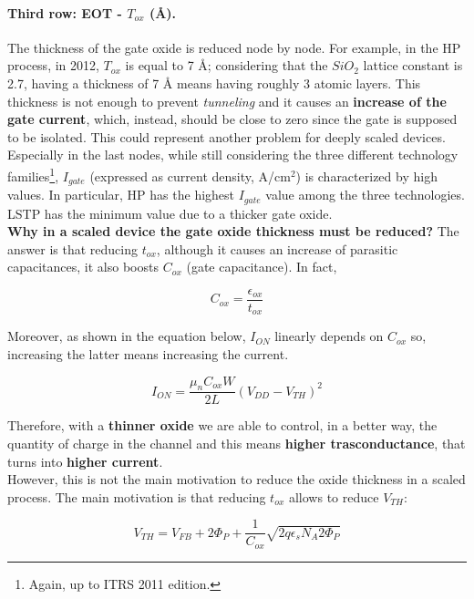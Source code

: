 \documentclass[a4paper, 12pt, twoside, openright]{report}
\begin{document}
\paragraph{Third row: EOT - $T_{ox}$ (\r{A}).} The thickness of the gate oxide is reduced node by node. For example, in the HP process, in 2012, $T_{ox}$ is equal to 7 \r{A}; considering that the $SiO_{2}$ lattice constant is 2.7, having a thickness of 7 \r{A} means having roughly 3 atomic layers. This thickness is not enough to prevent \emph{tunneling} and it causes an \textbf{increase of the gate current}, which, instead, should be close to zero since the gate is supposed to be isolated. This could represent another problem for deeply scaled devices.\\
Especially in the last nodes, while still considering the three different technology families\footnote{Again, up to ITRS 2011 edition.}, $I_{gate}$ (expressed as current density, A/cm$^{2}$) is characterized by high values. In particular, HP has the highest $I_{gate}$ value among the three technologies. LSTP has the minimum value due to a thicker gate oxide.\\
\textbf{Why in a scaled device the gate oxide thickness must be reduced?} The answer is that reducing $t_{ox}$, although it causes an increase of parasitic capacitances, it also boosts $C_{ox}$ (gate capacitance). In fact,

\begin{equation}
C_{ox} = \frac{\epsilon_{ox}}{t_{ox}}
\label{}
\end{equation}

Moreover, as shown in the equation below, $I_{ON}$ linearly depends on $C_{ox}$ so, increasing the latter means increasing the current.

\begin{equation}
I_{ON} = \frac{\mu_n C_{ox} W}{2 L} (V_{DD} - V_{TH})^2
\label{}
\end{equation}

Therefore, with a \textbf{thinner oxide} we are able to control, in a better way, the quantity of charge in the channel and this means \textbf{higher trasconductance}, that turns into \textbf{higher current}.\\
However, this is not the main motivation to reduce the oxide thickness in a scaled process. The main motivation is that reducing $t_{ox}$ allows to reduce $V_{TH}$:

\begin{equation}
V_{TH} = V_{FB} + 2 \Phi_{P} + \frac{1}{C_{ox}} \sqrt{2 q \epsilon_s N_A 2 \Phi_{P}}
\label{V_th}
\end{equation}
\end{document}

